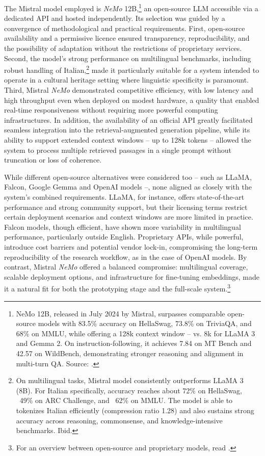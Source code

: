 \begin{spacing}{1.5}
The Mistral model employed is \textit{NeMo} 12B,\footnote{NeMo 12B, released in July 2024 by Mistral, surpasses comparable open-source models with 83.5\% accuracy on HellaSwag, 73.8\% on TriviaQA, and 68\% on MMLU, while offering a 128k context window -- vs. 8k for LLaMA 3 and Gemma 2. On instruction-following, it achieves 7.84 on MT Bench and 42.57 on WildBench, demonstrating stronger reasoning and alignment in multi-turn QA. Source: \cite{noauthor_mistral_2025}.} an open-source LLM accessible via a dedicated API and hosted independently. Its selection was guided by a convergence of methodological and practical requirements. First, open-source availability and a permissive licence ensured transparency, reproducibility, and the possibility of adaptation without the restrictions of proprietary services. Second, the model’s strong performance on multilingual benchmarks, including robust handling of Italian,\footnote{On multilingual tasks, Mistral model consistently outperforms LLaMA 3 (8B). For Italian specifically, accuracy reaches about 72\% on HellaSwag, ~49\% on ARC Challenge, and ~62\% on MMLU. The model is able to tokenizes Italian efficiently (compression ratio 1.28) and also sustains strong accuracy across reasoning, commonsense, and knowledge-intensive benchmarks. Ibid.} made it particularly suitable for a system intended to operate in a cultural heritage setting where linguistic specificity is paramount. Third, Mistral \textit{NeMo} demonstrated competitive efficiency, with low latency and high throughput even when deployed on modest hardware, a quality that enabled real-time responsiveness without requiring more powerful computing infrastructures. In addition, the availability of an official API greatly facilitated seamless integration into the retrieval-augmented generation pipeline, while its ability to support extended context windows -- up to 128k tokens -- allowed the system to process multiple retrieved passages in a single prompt without truncation or loss of coherence.

While different open-source alternatives were considered too -- such as LLaMA, Falcon, Google Gemma and OpenAI models --, none aligned as closely with the system’s combined requirements. LLaMA, for instance, offers state-of-the-art performance and strong community support, but their licensing terms restrict certain deployment scenarios and context windows are more limited in practice. Falcon models, though efficient, have shown more variability in multilingual performance, particularly outside English. Proprietary APIs, while powerful, introduce cost barriers and potential vendor lock-in, compromising the long-term reproducibility of the research workflow, as in the case of OpenAI models. By contrast, Mistral \textit{NeMo} offered a balanced compromise: multilingual coverage, scalable deployment options, and infrastructure for fine-tuning embeddings, made it a natural fit for both the prototyping stage and the full-scale system.\footnote{For an overview between open-source and proprietary models, read \textcite{noauthor_open_2025}.}


\end{spacing}
